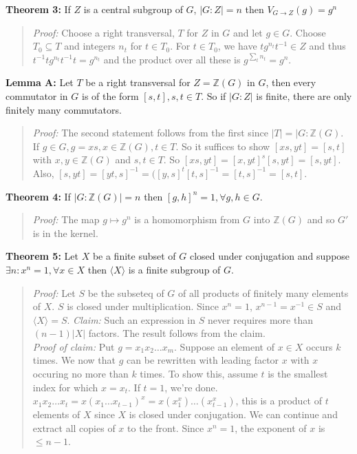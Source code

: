 {\bf Theorem 3:} 
If $Z$ is a central subgroup of $G$, $|G:Z|=n$ then
$V_{G \rightarrow Z}(g)= g^n$
\begin{quote}
\emph{Proof:}  
Choose a right transversal, $T$ for $Z$ in $G$ and let $g \in G$.  Choose $T_0 \subseteq T$
and integers $n_t$ for $t \in T_0$.  For $t \in T_0$, we have 
$t g^{n_t} t^{-1} \in Z$
and thus
$t^{-1} t g^{n_t} t^{-1} t= g^{n_t}$ and the product over all these is $g^{\sum_t n_t}= g^n$.
\end{quote}
{\bf Lemma A:} 
Let $T$ be a right transversal for $Z={\mathbb Z}(G)$ in $G$, then every commutator in $G$
is of the form $[s,t], s,t \in T$.  So if $|G:Z|$ is finite, there are only finitely 
many commutators.
\begin{quote}
\emph{Proof:}    The second statement follows from the first since $|T|= |G:{\mathbb Z}(G)$.
If $g \in G, g= xs, x \in {\mathbb Z}(G), t \in T$.  So it suffices to show 
$[xs,yt]=[s,t]$  with $x, y \in {\mathbb Z}(G)$ and $s, t \in T$.  So
$[xs,yt]= [x,yt]^s [s,yt]= [s,yt]$.  Also, 
$[s,yt]= [yt,s]^{-1}= ([y,s]^t [t,s]^{-1}= [t,s]^{-1}=[s,t]$.
\end{quote}
{\bf Theorem 4:} 
If $|G:{\mathbb Z}(G)|=n$ then $[g,h]^n=1, \forall g,h \in G$.
\begin{quote}
\emph{Proof:}  
The map $g \mapsto g^n$ is a homomorphism from $G$ into ${\mathbb Z}(G)$ and so $G'$ is
in the kernel.
\end{quote}
{\bf Theorem 5:} 
Let $X$ be a finite subset of $G$ closed under conjugation and 
suppose $\exists n: x^n = 1, \forall x \in X$ then $ \langle X \rangle $ is a 
finite subgroup of $G$.
\begin{quote}
\emph{Proof:}  
Let $S$ be the subseteq of $G$ of all products of finitely many elements of $X$.  $S$
is closed under multiplication.  Since $x^n=1$, $x^{n-1}= x^{-1} \in S$ and 
$ \langle X \rangle = S$.
\emph{Claim:} Such an expression in $S$ never requires more than $(n-1) |X|$ factors.  The result
follows from the claim.
\\
\emph {Proof of claim:} Put $g= x_1 x_2 \ldots x_m$. Suppose an element of $x \in X$ occurs $k$
times.  We now that $g$ can be rewritten with leading factor $x$ with $x$ occuring no more than
$k$ times.  To show this, assume $t$ is the smallest index for which $x=x_t$.  
If $t=1$, we're done.
$x_1 x_2 \ldots x_t = x(x_1 \ldots x_{t-1})^x= x (x_1^x) \ldots (x_{t-1}^x)$, this is
a product of $t$ elements of $X$ since $X$ is closed under conjugation. We can continue and
extract all copies of $x$ to the front.  Since $x^n=1$, the exponent of $x$ is $\le n-1$.
\end{quote}
